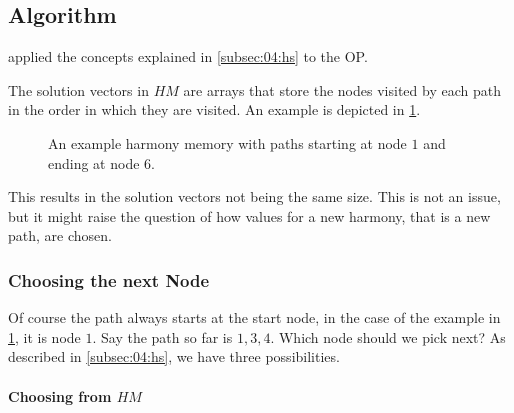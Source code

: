 \subsection{Algorithm}

\citeauthor{szwarc_novel_2022} applied the concepts explained in \cref{subsec:04:hs} to the OP. \cite{szwarc_novel_2022}

The solution vectors in $HM$ are arrays that store the nodes visited by each path in the order in which they are visited.
An example is depicted in \cref{fig:04:hm}.

\begin{figure}
    \centering
    \caption{An example harmony memory with paths starting at node $1$ and ending at node $6$.}
    \label{fig:04:hm}
\end{figure}

This results in the solution vectors not being the same size.
This is not an issue, but it might raise the question of how values for a new harmony, that is a new path, are chosen.

\subsubsection{Choosing the next Node}

Of course the path always starts at the start node, in the case of the example in \cref{fig:04:hm}, it is node $1$.
Say the path so far is $1, 3, 4$.
Which node should we pick next?
As described in \cref{subsec:04:hs}, we have three possibilities.

\paragraph{Choosing from $HM$}

